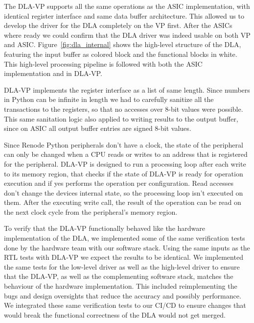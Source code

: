 \documentclass[12pt,a4paper,english
]{tunithesis}
\begin{document}
The DLA-VP supports all the same operations as the ASIC implementation, with identical register interface and same data buffer architecture. This allowed us to develop the driver for the DLA completely on the VP first. After the ASICs where ready we could confirm that the DLA driver was indeed usable on both VP and ASIC. Figure~\ref{fig:dla_internal} shows the high-level structure of the DLA, featuring the input buffer as colored block and the functional blocks in white. This high-level processing pipeline is followed with both the ASIC implementation and in DLA-VP.

DLA-VP implements the register interface as a list of same length. Since numbers in Python can be infinite in length we had to carefully sanitize all the transactions to the registers, so that no accesses over 8-bit values were possible. This same sanitation logic also applied to writing results to the output buffer, since on ASIC all output buffer entries are signed 8-bit values.

Since Renode Python peripherals don't have a clock, the state of the peripheral can only be changed when a CPU reads or writes to an address that is registered for the peripheral. DLA-VP is designed to run a processing loop after each write to its memory region, that checks if the state of DLA-VP is ready for operation execution and if yes performs the operation per configuration. Read accesses don't change the devices internal state, so the processing loop isn't executed on them. After the executing write call, the result of the operation can be read on the next clock cycle from the peripheral's memory region.

To verify that the DLA-VP functionally behaved like the hardware implementation of the DLA, we implemented some of the same verification tests done by the hardware team with our software stack. Using the same inputs as the RTL tests with DLA-VP we expect the results to be identical. We implemented the same tests for the low-level driver as well as the high-level driver to ensure that the DLA-VP, as well as the complementing software stack, matches the behaviour of the hardware implementation. This included reimplementing the bugs and design oversights that reduce the accuracy and possibly performance. We integrated these same verification tests to our CI/CD to ensure changes that would break the functional correctness of the DLA would not get merged.
\end{document}
